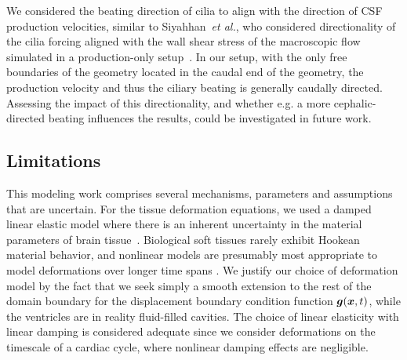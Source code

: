 \documentclass{template}
\begin{document}
We considered the beating direction of cilia to align with the direction of 
CSF production velocities, similar to Siyahhan~\emph{et al.}, who considered
directionality of the cilia forcing aligned
with the wall shear stress of the macroscopic flow simulated in a
production-only setup~\citep{Siyahhan2014FlowVentricles}.
In our setup, with the only free boundaries of the geometry located
in the caudal end of the geometry, the production velocity and thus
the ciliary beating is generally caudally directed. Assessing the impact
of this directionality, and whether e.g. a more cephalic-directed beating
influences the results, could be investigated in future work.

\subsection{Limitations}
\label{subsec:limitations}

This modeling work comprises several mechanisms, parameters and
assumptions that are uncertain.
For the tissue deformation equations, we used a damped linear elastic model
where there is an inherent
uncertainty in the material parameters
of brain tissue~\citep{smillie2005hydroelastic}.
Biological soft tissues rarely exhibit Hookean material behavior,
and nonlinear models are presumably most appropriate to
model deformations over longer time spans
\citep{Cheng2010ComputationalModel, Cheng2007UnconfinedCompression,
smillie2005hydroelastic, tully2009coupling, kaczmarek1997hydromechanics}.
We justify our choice of deformation model by the fact that
we seek simply a smooth extension to the rest of the domain boundary
for the displacement boundary condition function $\bm{g}(\bm{x}, t)$,
while the ventricles are in reality fluid-filled cavities.
The choice of linear elasticity with linear damping is considered
adequate since we consider deformations on the timescale of a cardiac cycle,
where nonlinear damping effects are negligible.
\end{document}
